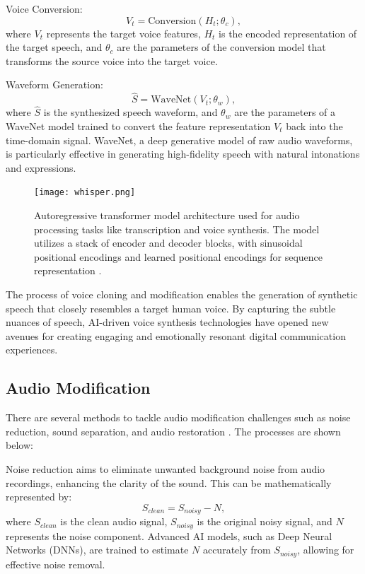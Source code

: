 \documentclass[11pt,a4paper,oneside]{report}
\begin{document}
Voice Conversion:
\begin{equation}
V_t = \text{Conversion}(H_t; \theta_c),
\end{equation}
where $V_t$ represents the target voice features, $H_t$ is the encoded representation of the target speech, and $\theta_c$ are the parameters of the conversion model that transforms the source voice into the target voice.

Waveform Generation:
\begin{equation}
\hat{S} = \text{WaveNet}(V_t; \theta_w),
\end{equation}
where $\hat{S}$ is the synthesized speech waveform, and $\theta_w$ are the parameters of a WaveNet \cite{oord2016wavenet} model trained to convert the feature representation $V_t$ back into the time-domain signal. WaveNet, a deep generative model of raw audio waveforms, is particularly effective in generating high-fidelity speech with natural intonations and expressions.

\begin{figure}[htbp]
  \centering
  \texttt{[image: whisper.png]}
  \caption{Autoregressive transformer model architecture used for audio processing tasks like transcription and voice synthesis. The model utilizes a stack of encoder and decoder blocks, with sinusoidal positional encodings and learned positional encodings for sequence representation \cite{OpenAIWhisper}.}
\end{figure}

The process of voice cloning and modification enables the generation of synthetic speech that closely resembles a target human voice. 
By capturing the subtle nuances of speech, AI-driven voice synthesis technologies have opened new avenues for creating engaging and emotionally resonant digital communication experiences. 



\subsection{Audio Modification}

There are several methods to tackle audio modification challenges such as noise reduction, sound separation, and audio restoration \cite{godsill2002digital}. 
The processes are shown below:

Noise reduction aims to eliminate unwanted background noise from audio recordings, enhancing the clarity of the sound. This can be mathematically represented by:
\begin{equation}
S_{clean} = S_{noisy} - N,
\end{equation}
where $S_{clean}$ is the clean audio signal, $S_{noisy}$ is the original noisy signal, and $N$ represents the noise component. Advanced AI models, such as Deep Neural Networks (DNNs), are trained to estimate $N$ accurately from $S_{noisy}$, allowing for effective noise removal.
\end{document}
